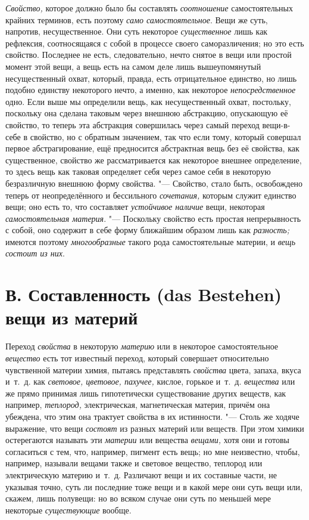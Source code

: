 {\em Свойство,} которое должно было бы составлять
{\em соотношение} самостоятельных крайних терминов,
есть поэтому {\em само самостоятельное}. Вещи же суть,
напротив, несущественное. Они суть некоторое
{\em существенное} лишь как рефлексия, соотносящаяся с
собой в процессе своего саморазличения; но это есть свойство. Последнее не
есть, следовательно, нечто снятое в вещи или простой момент этой вещи, а
вещь есть на самом деле лишь вышеупомянутый несущественный охват, который,
правда, есть отрицательное единство, но лишь подобно единству некоторого
нечто, а именно, как некоторое {\em непосредственное}
одно. Если выше мы определили вещь, как несущественный охват, постольку,
поскольку она сделана таковым через внешнюю абстракцию, опускающую её
свойство, то теперь эта абстракция совершилась через самый переход
вещи-в-себе в свойство, но с обратным значением, так что если тому, который
совершал первое абстрагирование, ещё предносится абстрактная вещь без её
свойства, как существенное, свойство же рассматривается как некоторое
внешнее определение, то здесь вещь как таковая определяет себя через самое
себя в некоторую безразличную внешнюю форму свойства. "--- Свойство, стало
быть, освобождено теперь от неопределённого и бессильного
{\em сочетания,} которым служит единство вещи; оно есть
то, что составляет {\em устойчивое наличие} вещи,
некоторая {\em самостоятельная материя}. "--- Поскольку
свойство есть простая непрерывность с собой, оно содержит в себе форму
ближайшим образом лишь как {\em разность;} имеются
поэтому {\em многообразные} такого рода самостоятельные
материи, и {\em вещь состоит из них}.


\section[В. Составленность (das Bestehen) вещи из материй]
{В. Составленность (das Bestehen) вещи из материй}

Переход {\em свойства} в
некоторую {\em материю} или в некоторое самостоятельное
{\em вещество} есть тот известный переход, который
совершает относительно чувственной материи химия, пытаясь представлять
{\em свойства} цвета, запаха, вкуса и~т.~д. как
{\em световое, цветовое, пахучее,} кислое, горькое
и~т.~д. {\em вещества} или же прямо принимая лишь
гипотетически существование других веществ, как например,
{\em теплород,} электрическая, магнетическая материя,
причём она убеждена, что этим она трактует свойства в их истинности. "---
Столь же ходяче выражение, что вещи {\em состоят} из
разных материй или веществ. При этом химики остерегаются называть эти
{\em материи} или вещества
{\em вещами,} хотя они и готовы согласиться с тем, что,
например, пигмент есть вещь; но мне неизвестно, чтобы, например, называли
вещами также и световое вещество, теплород или электрическую материю
и~т.~д. Различают вещи и их составные части, не указывая точно, суть ли
последние тоже вещи и в какой мере они суть вещи или, скажем, лишь
полувещи: но во всяком случае они суть по меньшей мере некоторые
{\em существующие} вообще.

